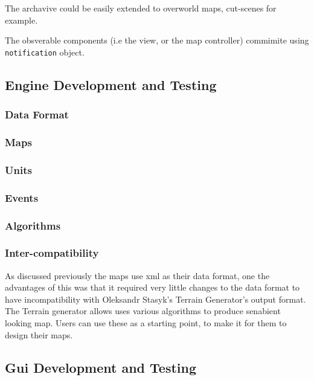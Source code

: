 The archavive could be easily extended to overworld maps, cut-scenes for example.


The obsverable components (i.e the view, or the map controller) commimite using \texttt{notification} object. 


\subsection{Engine Development and Testing}
\label{sub:engine_development_and_testing}

\subsubsection{Data Format}


\subsubsection{Maps}
\label{ssub:maps}

\subsubsection{Units}
\label{ssub:units}

\subsubsection{Events}
\label{ssub:events}

\subsubsection{Algorithms}
\label{ssub:Algorithms}

\subsubsection{Inter-compatibility}
\label{ssub:intercompatibility}
As discussed previously the maps use xml as their data format, one the advantages of this was that it required very little changes to the data format to have incompatibility with Oleksandr Stasyk's  Terrain Generator's output format.  The Terrain generator allows uses various algorithms to produce senabient looking map. Users can use these as a starting  point, to make it for them to design their maps.


\subsection{Gui Development and Testing}

